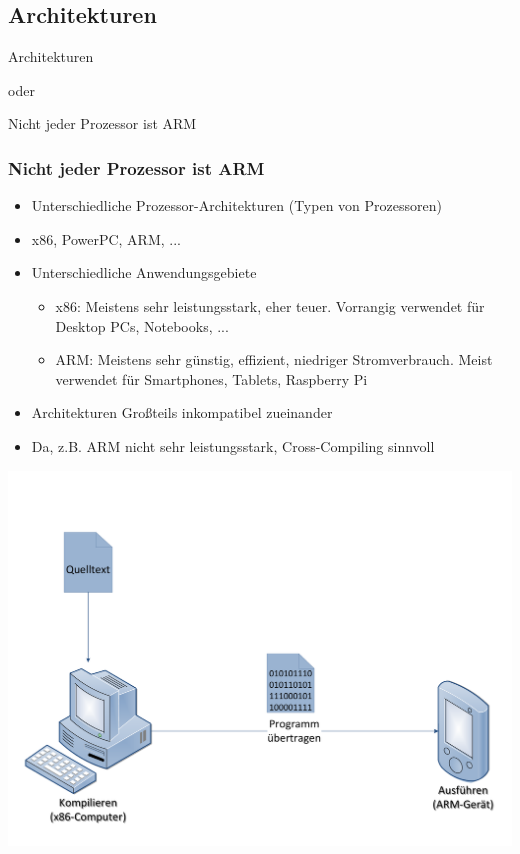 \documentclass{beamer}
\begin{document}
\subsection{Architekturen}
\begin{frame}
\begin{center}
\begin{Huge}
Architekturen\\
\end{Huge}
oder\\
\begin{LARGE}
\glqq Nicht jeder Prozessor ist ARM\grqq
\end{LARGE}
\end{center}
\end{frame}

\begin{frame}
\frametitle{Nicht jeder Prozessor ist ARM}
\begin{itemize}
\item Unterschiedliche Prozessor-Architekturen (Typen von Prozessoren)
\item x86, PowerPC, ARM, ...
\item Unterschiedliche Anwendungsgebiete
\begin{itemize}
\item x86: Meistens sehr leistungsstark, eher teuer. Vorrangig verwendet für Desktop PCs, Notebooks, ...
\item ARM: Meistens sehr günstig, effizient, niedriger Stromverbrauch. Meist verwendet für Smartphones, Tablets, Raspberry Pi
\end{itemize}
\item Architekturen Großteils inkompatibel zueinander
\item Da, z.B. ARM nicht sehr leistungsstark, Cross-Compiling sinnvoll
\end{itemize}
\end{frame}

\begin{frame}
\begin{center}
\includegraphics[scale=.3]{image/Cross-compile.pdf} 
\end{center}
\end{frame}
\end{document}
